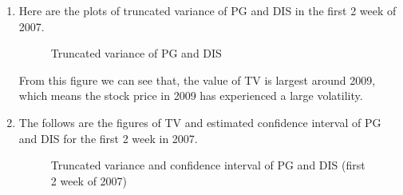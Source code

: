 \documentclass[12pt,letterpaper]{article}
\begin{document}
\begin{enumerate}[label=\textbf{(\Alph*)}]
\item Here are the plots of truncated variance of PG and DIS in the first 2 week of 2007.

 \begin{figure}[H]
            \centering
            \caption{Truncated variance of PG and DIS}
\end{figure}

From this figure we can see that, the value of TV is largest around 2009, which means the stock price in 2009 has experienced a large volatility. 


\item The follows are the figures of TV and estimated confidence interval of PG and DIS for the first 2 week in 2007.
 \begin{figure}[H]
            \centering
            \caption{Truncated variance and confidence interval of PG and DIS (first 2 week of 2007)}
\end{figure}


\end{enumerate}
\end{document}
